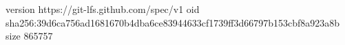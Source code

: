 version https://git-lfs.github.com/spec/v1
oid sha256:39d6ca756ad1681670b4dba6ce83944633cf1739ff3d66797b153cbf8a923a8b
size 865757
